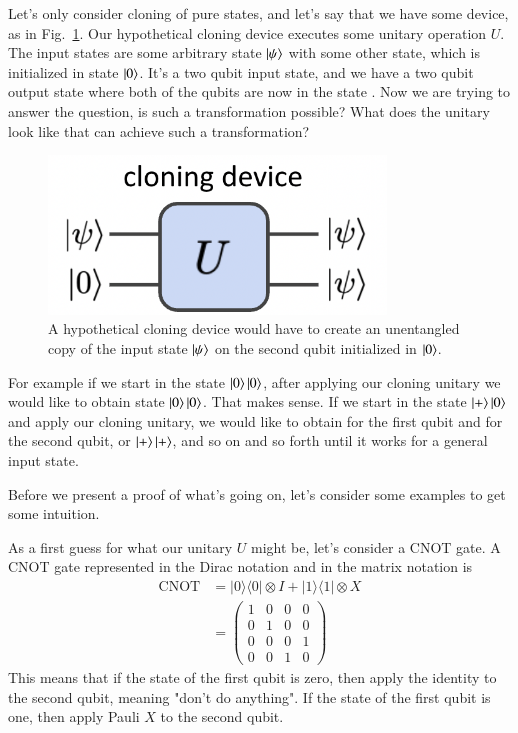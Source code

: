 Let's only consider cloning of pure states, and let's say that we have some device, as in Fig.~\ref{fig:cloner}. Our hypothetical cloning device executes some unitary operation $U$. The input states are some arbitrary state $\left| \psi \right\rangle$ with some other state, which is initialized in state $\left| 0 \right\rangle$. It's a two qubit input state, and we have a two qubit output state where both of the qubits are now in the state \ket{\psi}. Now we are trying to answer the question, is such a transformation possible? What does the unitary look like that can achieve such a transformation?
\begin{figure}[H]
    \centering
    \includegraphics[width=0.8\textwidth]{lesson8/cloning-device.png}
        \caption{A hypothetical cloning device would have to create an unentangled copy of the input state $\left| \psi \right\rangle$ on the second qubit initialized in $\left| 0 \right\rangle$.}
    \label{fig:cloner}
\end{figure}

For example if we start in the state $\left| 0 \right\rangle\left| 0 \right\rangle$, after applying our cloning unitary we would like to obtain state $\left| 0 \right\rangle\left| 0 \right\rangle$. That makes sense. If we start in the state $\left| + \right\rangle\left| 0 \right\rangle$ and apply our cloning unitary, we would like to obtain \ket{+} for the first qubit and \ket{+} for the second qubit, or $\left| + \right\rangle\left| + \right\rangle$, and so on and so forth until it works for a general input state.

Before we present a proof of what's going on, let's consider some examples to get some intuition.

As a first guess for what our unitary $U$ might be, let's consider a CNOT gate. A CNOT gate represented in the Dirac notation and in the matrix notation is
\begin{equation}
\begin{aligned}
\operatorname{CNOT} &=|0\rangle\langle 0|\otimes I+| 1\rangle\langle 1| \otimes X \\
&=\left(\begin{array}{llll}
1 & 0 & 0 & 0 \\
0 & 1 & 0 & 0 \\
0 & 0 & 0 & 1 \\
0 & 0 & 1 & 0
\end{array}\right)
\end{aligned}
\end{equation}
This means that if the state of the first qubit is zero, then apply the identity to the second qubit, meaning "don't do anything". If the state of the first qubit is one, then apply Pauli $X$ to the second qubit.

